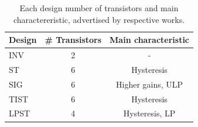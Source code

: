 \documentclass[pgmicro,diss,english]{iiufrgs}
\begin{document}
\begin{table}[]
\centering
\caption{Each design number of transistors and main charactereristic, advertised by respective works.}
\label{tab:designHighlight}
\begin{tabular}{lcc}
\hline
Design & \# Transistors & Main characteristic \\ \hline
INV & 2 & - \\ \hline
ST & 6 & Hysteresis \\ \hline
SIG & 6 & Higher gains, ULP \\ \hline
TIST & 6 & Hysteresis \\ \hline
LPST & 4 & Hysteresis, LP \\ \hline
\end{tabular}
\end{table}



\end{document}
